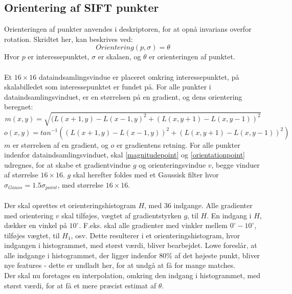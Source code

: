 \subsection{Orientering af SIFT punkter}
Orienteringen af punkter anvendes i deskriptoren, for at opnå invarians overfor rotation. Skridtet her, kan beskrives ved:
\begin{equation}
Orientering(p, \sigma) = \theta
\end{equation}
Hvor $p$ er interessepunktet, $\sigma$ er skalaen, og $\theta$ er orienteringen af punktet. 
\\
\\
Et $16\times16$ dataindsamlingsvindue er placeret omkring interessepunktet, på skalabilledet som interessepunktet er fundet på. For alle punkter i dataindsamlingsvinduet, er en størrelsen på en gradient, og dens orientering beregnet:
\begin{equation}
m(x,y) = \sqrt{(L(x + 1, y) - L(x - 1, y)^2 + (L(x, y + 1) - L(x, y - 1))^2  } 
\label{magnitudepoint}
\end{equation}
\begin{equation}
o(x,y) = tan^{-1}((L(x + 1, y) - L(x - 1, y))^2 + (L(x, y + 1) - L(x, y - 1))^2 ) 
\label{orientationpoint}
\end{equation}
$m$ er størrelsen af en gradient, og $o$ er gradientens retning. For alle punkter indenfor dataindsamlingsvinduet, skal 
\eqref{magnitudepoint} og \eqref{orientationpoint} udregnes, for at skabe et gradientvindue $g$ og orienteringsvindue $v$, begge vinduer af størrelse $16\times16$. $g$ skal herefter foldes med et Gaussisk filter hvor $\sigma_{Gauss} = 1.5\sigma_{point} $, med størrelse $16\times16$.
\\
\\
Der skal oprettes et orienteringshistogram $H$, med 36 indgange. Alle gradienter med orientering $v$ skal tilføjes, vægtet af gradientstyrken $g$, til $H$. En indgang i $H$, dækker en vinkel på $10^{\circ}$. F.eks. skal alle gradienter med vinkler mellem  $0^{\circ}-10^{\circ}$, tilføjes vægtet, til $H_1$, osv. Dette resulterer i et orienteringshistogram, hvor indgangen i histogrammet, med størst værdi, bliver bearbejdet. Lowe foreslår, at alle indgange i histogrammet, der ligger indenfor 80\% af det højeste punkt, bliver nye features - dette er undladt her, for at undgå at få for mange matches.
\\
Der skal nu foretages en interpolation, omkring den indgang i histogrammet, med størst værdi, for at få et mere præcist estimat af $\theta$.

